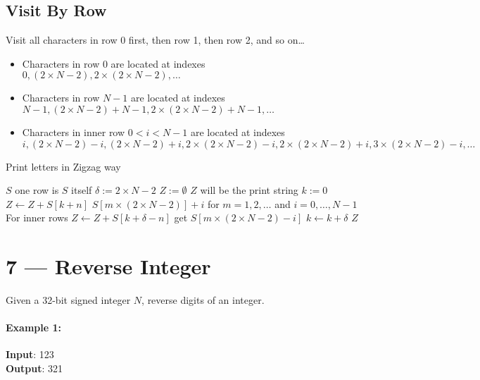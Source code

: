 \subsection{Visit By Row}
Visit all characters in row 0 first, then row 1, then row 2, and so on\dots
\par
\begin{itemize}
\item Characters in row $0$ are located at indexes $0, \left(2 \times N - 2\right), 2\times\left(2 \times N - 2\right), \ldots$
\item Characters in row $N-1$ are located at indexes $N-1, \left(2 \times N - 2\right) + N - 1, 2\times\left(2 \times N - 2\right) + N - 1, \ldots$
\item Characters in inner row $0<i<N-1$ are located at indexes 
\[
i, \left(2 \times N - 2\right)-i, \left(2 \times N - 2\right) + i, 2\times\left(2 \times N - 2\right)- i, 2\times\left(2 \times N - 2\right)+ i, 3\times\left(2 \times N - 2\right)- i, \dots
\]
\end{itemize}
\setcounter{algorithm}{0}
\begin{algorithm}[H]
\caption{Print letters in Zigzag way}
\begin{algorithmic}[1]
\Statex
{}
\State \Return $S$ \Comment one row is $S$ itself
\EndIf
\State $\delta := 2 \times N -2$
\State $Z:= \emptyset$ \Comment $Z$ will be the print string
\State $k:= 0$
\State $Z \gets Z + S[k+n]$ \Comment $S[m\times \left(2 \times N - 2\right)] + i$ for $m = 1,2, \ldots$ and $i = 0, \ldots, N-1$
 \Comment For inner rows
\State $Z \gets Z + S[k+\delta-n]$ \Comment get $S[m\times\left(2 \times N - 2\right)- i]$
\EndIf
\State $k \gets k+\delta$
\EndWhile
\EndFor
\State \Return $Z$
\EndProcedure
\Statex
\end{algorithmic}
\end{algorithm}

\section{7 --- Reverse Integer}
Given a 32-bit signed integer $N$, reverse digits of an integer.
\paragraph{Example 1:}
\begin{flushleft}
\textbf{Input}: 123
\\
\textbf{Output}: 321
\end{flushleft}
